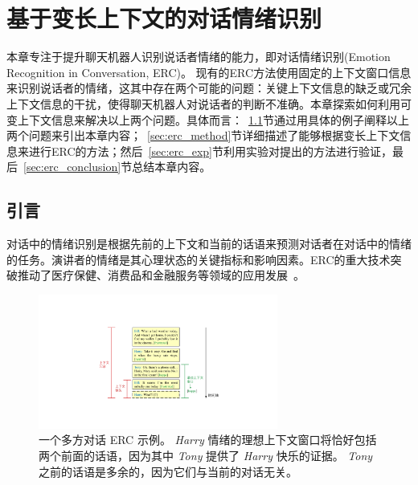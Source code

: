 \chapter{基于变长上下文的对话情绪识别}
\label{cha:erc}
本章专注于提升聊天机器人识别说话者情绪的能力，即对话情绪识别(Emotion Recognition in Conversation, ERC)。 现有的ERC方法使用固定的上下文窗口信息来识别说话者的情绪，这其中存在两个可能的问题：关键上下文信息的缺乏或冗余上下文信息的干扰，使得聊天机器人对说话者的判断不准确。本章探索如何利用可变上下文信息来解决以上两个问题。具体而言：~\ref{sec:erc_intro}节通过用具体的例子阐释以上两个问题来引出本章内容；~\ref{sec:erc_method}节详细描述了能够根据变长上下文信息来进行ERC的方法；然后~\ref{sec:erc_exp}节利用实验对提出的方法进行验证，最后~\ref{sec:erc_conclusion}节总结本章内容。



\section{引言}\label{sec:erc_intro}

对话中的情绪识别是根据先前的上下文和当前的话语来预测对话者在对话中的情绪的任务。演讲者的情绪是其心理状态的关键指标和影响因素。ERC的重大技术突破推动了医疗保健、消费品和金融服务等领域的应用发展~\cite{devillers2002annotation,nasukawa2003sentiment,forbes2004predicting,lee2005toward,devillers2006real,liu2012sentiment,poria2019emotion}。

\begin{figure}[ht]
\centering
\includegraphics[width=0.7\textwidth]{erc_pics/example.pdf}
\caption{一个多方对话 ERC 示例。 \textit{Harry} 情绪的理想上下文窗口将恰好包括两个前面的话语，因为其中 \textit{Tony} 提供了 \textit{Harry} 快乐的证据。 \textit{Tony} 之前的话语是多余的，因为它们与当前的对话无关。}\label{fig:example}
\end{figure}

